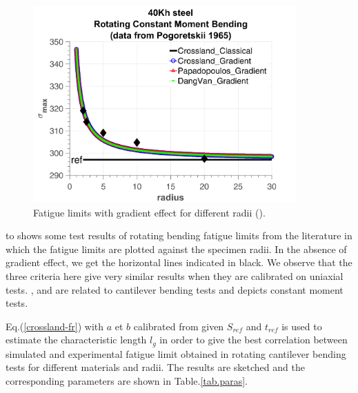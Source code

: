 \begin{figure}[!h]
	\begin{center}
		\includegraphics[width=0.9\textwidth]{figures//40khsteel.png} 
		\caption{Fatigue limits with gradient effect for different radii (\cite{Papadopoulos1996513}).}
		\label{fig.gradientcalibration4}
	\end{center}
\end{figure}
\newpage

 to  shows some test results of rotating bending fatigue limits
from the literature in which the fatigue limits are plotted against
the specimen radii. In the absence of gradient effect, we get the horizontal lines indicated in black. We observe that the three criteria here give very similar results when they are calibrated on uniaxial tests. ,  and  are related to cantilever bending
tests and  depicts constant moment tests.

Eq.(\ref{crossland-fr}) with $a$ et $b$ calibrated from given $S_{ref}$ and $t_{ref}$ is used to estimate the characteristic length $l_g$ in order to give the best correlation between simulated and experimental fatigue limit obtained in rotating cantilever bending tests for different materials and radii. The results are sketched and the corresponding parameters are shown in Table.\ref{tab.paras}.

